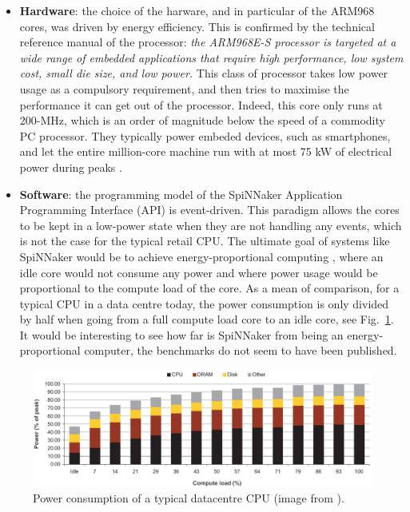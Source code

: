 \begin{itemize}
\item \textbf{Hardware}: the choice of the harware, and in particular of the ARM968 cores, was driven by energy efficiency. This is confirmed by the technical reference manual of the processor: \textit{the ARM968E-S processor is targeted at a wide range of embedded applications that require high performance, low system cost, small die size, and low power.} \cite{arm968} This class of processor takes low power usage as a compulsory requirement, and then tries to maximise the performance it can get out of the processor. Indeed, this core only runs at 200-MHz, which is an order of magnitude below the speed of a commodity PC processor. They typically power embeded devices, such as smartphones, and let the entire million-core machine run with at most 75 kW of electrical power during peaks \cite{spinnaker}. %

\item \textbf{Software}: the programming model of the SpiNNaker Application Programming Interface (API) is event-driven. This paradigm allows the cores to be kept in a low-power state when they are not handling any events, which is not the case for the typical retail CPU. The ultimate goal of systems like SpiNNaker would be to achieve energy-proportional computing \cite{energy-prop}, where an idle core would not consume any power and where power usage would be proportional to the compute load of the core. As a mean of comparison, for a typical CPU in a data centre today, the power consumption is only divided by half when going from a full compute load core to an idle core, see Fig.~\ref{fig:energy-non-prop}. It would be interesting to see how far is SpiNNaker from being an energy-proportional computer, the benchmarks do not seem to have been published.
\end{itemize}
 
\begin{figure}[!ht]
\centering
\includegraphics[width = 1\hsize]{figures/energy-non-prop.png}
\caption{Power consumption of a typical datacentre CPU (image from \cite{energy-non-prop}).}
\label{fig:energy-non-prop}
\end{figure}


